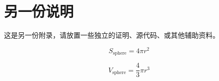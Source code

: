 \documentclass[lang=chs, degree=phd, blindreview=false, winfonts=true, academic=true]{yanputhesis}
\begin{document}
\chapter{另一份说明}

这是另一份附录，请放置一些独立的证明、源代码、或其他辅助资料。


\begin{equation}
    S_{\text{sphere}} = 4 \pi r^2
\end{equation}

\begin{equation}
    V_{\text{sphere}} = \frac43 \pi r^3
\end{equation}

\cleardoublepage
\backmatter                                                 %
\end{document}
